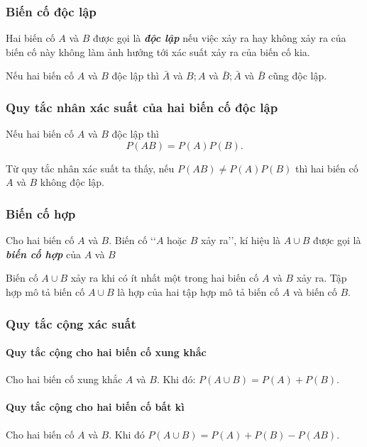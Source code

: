 \begin{tomtat}
	\subsubsection{Biến cố độc lập}
	\begin{boxdn}
	Hai biến cố $A$ và $B$ được gọi là {\bf \textit{độc lập}} nếu việc xảy ra hay không xảy ra của biến cố này không làm ảnh hưởng tới xác suất xảy ra của biến cố kia.
	\end{boxdn}
	\begin{nx}
	Nếu hai biến cố $A$ và $B$ độc lập thì $\bar{A}$ và $B ; A$ và $\bar{B} ; \bar{A}$ và $\bar{B}$ cũng độc lập.
	\end{nx}	
	\subsubsection{Quy tắc nhân xác suất của hai biến cố độc lập}
	\begin{boxdn}
	Nếu hai biến cố $A$ và $B$ độc lập thì
	$$P(A B)=P(A) P(B).$$
	\end{boxdn}
	\begin{note}
	Từ quy tắc nhân xác suất ta thấy, nếu $P(A B) \neq P(A) P(B)$ thì hai biến cố $A$ và $B$ không độc lập.
	\end{note}
	\subsubsection{Biến cố hợp}
\begin{boxdn}
	{Cho hai biến cố $A$ và $B$. Biến cố \lq\lq $A$ hoặc $B$ xảy ra\rq\rq, kí hiệu là $A\cup B$ được gọi là \textbf{\textit{biến cố hợp}} của $A$ và $B$}
\end{boxdn}
\begin{note}
	{Biến cố $A \cup B$ xảy ra khi có ít nhất một trong hai biến cố $A$ và $B$ xảy ra. Tập hợp mô tả biến cố $A \cup B$ là hợp của hai tập hợp mô tả biến cố $A$ và biến cố $B$.}
\end{note}
\subsubsection{Quy tắc cộng xác suất}
\paragraph{Quy tắc cộng cho hai biến cố xung khắc}
\begin{boxdn}
	{Cho hai biến cố xung khắc $A$ và $B$. Khi đó: $P(A \cup B)=P(A)+P(B)$.}
\end{boxdn}
\paragraph{Quy tắc cộng cho hai biến cố bất kì}
\begin{boxdn}
	{Cho hai biến cố $A$ và $B$. Khi đó $P(A \cup B)=P(A)+P(B)-P(A B)$.}
\end{boxdn}
\end{tomtat}
